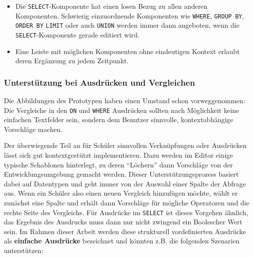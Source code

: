 \begin{itemize}
\item Die \texttt{SELECT}-Komponente hat einen losen Bezug zu allen anderen Komponenten. Schwierig einzuordnende Komponenten wie \texttt{WHERE}, \texttt{GROUP BY}, \texttt{ORDER BY} \texttt{LIMIT} oder auch \texttt{UNION} werden immer dann angeboten, wenn die \texttt{SELECT}-Komponente gerade editiert wird.
\item Eine Leiste mit möglichen Komponenten ohne eindeutigen Kontext erlaubt deren Ergänzung zu jedem Zeitpunkt.
\end{itemize}


\subsubsection{Unterstützung bei Ausdrücken und Vergleichen}
\label{sec:sql-compare-and-expression}

Die Abbildungen des Prototypen haben einen Umstand schon vorweggenommen: Die Vergleiche in den \texttt{ON} und \texttt{WHERE} Ausdrücken sollten nach Möglichkeit keine einfachen Textfelder sein, sondern dem Benutzer sinnvolle, kontextabhängige Vorschläge machen.

Der überwiegende Teil an für Schüler sinnvollen Verknüpfungen oder Ausdrücken lässt sich gut kontextgestützt implementieren. Dazu werden im Editor einige typische Schablonen hinterlegt, zu deren ``Löchern'' dann Vorschläge von der Entwicklungsumgebung gemacht werden. Dieser Unterstützungsprozess basiert dabei auf Datentypen und geht immer von der Auswahl einer Spalte der Abfrage aus. Wenn ein Schüler also einen neuen Vergleich hinzufügen möchte, wählt er zunächst eine Spalte und erhält dann Vorschläge für mögliche Operatoren und die rechte Seite des Vergleichs. Für Ausdrücke im \texttt{SELECT} ist dieses Vorgehen ähnlich, das Ergebnis des Ausdrucks muss dann nur nicht zwingend ein Boolescher Wert sein. Im Rahmen dieser Arbeit werden diese strukturell vordefinierten Ausdrücke als \textbf{einfache Ausdrücke} bezeichnet und könnten z.B. die folgenden Szenarien unterstützen:

